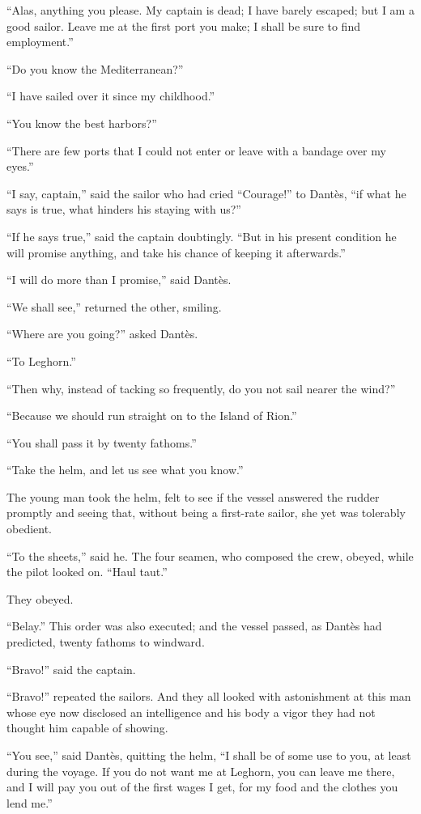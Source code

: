 “Alas, anything you please. My captain is dead; I have barely escaped;
but I am a good sailor. Leave me at the first port you make; I shall be
sure to find employment.”

“Do you know the Mediterranean?”

“I have sailed over it since my childhood.”

“You know the best harbors?”

“There are few ports that I could not enter or leave with a bandage
over my eyes.”

“I say, captain,” said the sailor who had cried “Courage!” to Dantès,
“if what he says is true, what hinders his staying with us?”

“If he says true,” said the captain doubtingly. “But in his present
condition he will promise anything, and take his chance of keeping it
afterwards.”

“I will do more than I promise,” said Dantès.

“We shall see,” returned the other, smiling.

“Where are you going?” asked Dantès.

“To Leghorn.”

“Then why, instead of tacking so frequently, do you not sail nearer the
wind?”

“Because we should run straight on to the Island of Rion.”

“You shall pass it by twenty fathoms.”

“Take the helm, and let us see what you know.”

The young man took the helm, felt to see if the vessel answered the
rudder promptly and seeing that, without being a first-rate sailor, she
yet was tolerably obedient.

“To the sheets,” said he. The four seamen, who composed the crew,
obeyed, while the pilot looked on. “Haul taut.”

They obeyed.

“Belay.” This order was also executed; and the vessel passed, as Dantès
had predicted, twenty fathoms to windward.

“Bravo!” said the captain.

“Bravo!” repeated the sailors. And they all looked with astonishment at
this man whose eye now disclosed an intelligence and his body a vigor
they had not thought him capable of showing.

“You see,” said Dantès, quitting the helm, “I shall be of some use to
you, at least during the voyage. If you do not want me at Leghorn, you
can leave me there, and I will pay you out of the first wages I get,
for my food and the clothes you lend me.”

